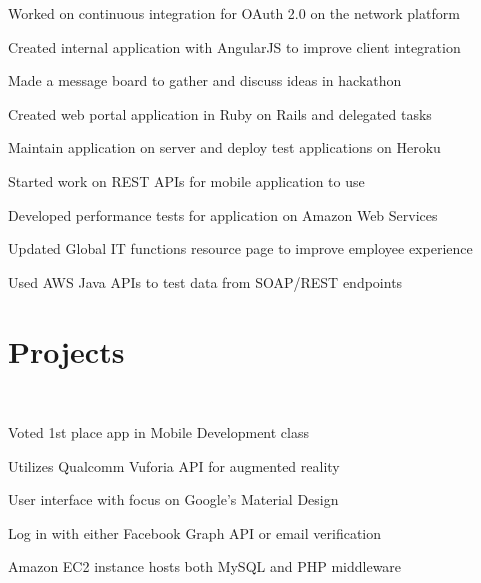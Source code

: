 \documentclass[]{deedy-resume-openfont}
\begin{document}
\begin{minipage}[t]{0.66\textwidth}
\begin{tightemize}
\item Worked on continuous integration for OAuth 2.0 on the network platform
\item Created internal application with AngularJS to improve client integration
\item Made a message board to gather and discuss ideas in hackathon
\end{tightemize}
\sectionsep

\begin{tightemize}
\item Created web portal application in Ruby on Rails and delegated tasks
\item Maintain application on server and deploy test applications on Heroku
\item Started work on REST APIs for mobile application to use
\end{tightemize}
\sectionsep

\begin{tightemize}
\item Developed performance tests for application on Amazon Web Services
\item Updated Global IT functions resource page to improve employee experience
\item Used AWS Java APIs to test data from SOAP/REST endpoints
\end{tightemize}
\sectionsep


\section{Projects}
\href{http://augmonted.github.io}{} \\
\begin{tightemize}
\item Voted 1st place app in Mobile Development class
\item Utilizes Qualcomm Vuforia API for augmented reality
\item User interface with focus on Google's Material Design
\item Log in with either Facebook Graph API or email verification
\item Amazon EC2 instance hosts both MySQL and PHP middleware
\end{tightemize}
\sectionsep


\end{minipage}
\end{document}
